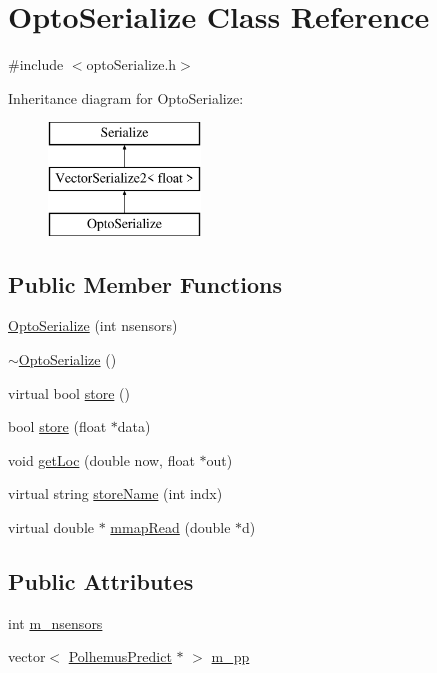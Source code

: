 \hypertarget{classOptoSerialize}{\section{Opto\-Serialize Class Reference}
\label{classOptoSerialize}
}


{\ttfamily \#include $<$opto\-Serialize.\-h$>$}

Inheritance diagram for Opto\-Serialize\-:\begin{figure}[H]
\begin{center}
\leavevmode
\includegraphics[height=3.000000cm]{classOptoSerialize}
\end{center}
\end{figure}
\subsection*{Public Member Functions}
\begin{DoxyCompactItemize}
\item 
\hyperlink{classOptoSerialize_a4b115e74d86c722fd109b3786bbec847}{Opto\-Serialize} (int nsensors)
\item 
\hyperlink{classOptoSerialize_a28b3097639217d817ea084cc870f34b4}{$\sim$\-Opto\-Serialize} ()
\item 
virtual bool \hyperlink{classOptoSerialize_aef848193a25e0b103e31f8d25035af16}{store} ()
\item 
bool \hyperlink{classOptoSerialize_a57544cacf42315f991a6a1d5bfc69d11}{store} (float $\ast$data)
\item 
void \hyperlink{classOptoSerialize_a3c2758b5a41759414f32a90d514ff5b8}{get\-Loc} (double now, float $\ast$out)
\item 
virtual string \hyperlink{classOptoSerialize_a6a29e96b87575f2906b65be40c38ceb2}{store\-Name} (int indx)
\item 
virtual double $\ast$ \hyperlink{classOptoSerialize_a35e6ee49e354276af9548a759fa3f3d2}{mmap\-Read} (double $\ast$d)
\end{DoxyCompactItemize}
\subsection*{Public Attributes}
\begin{DoxyCompactItemize}
\item 
int \hyperlink{classOptoSerialize_acf6821903586a62e8e3d20ffec81a913}{m\-\_\-nsensors}
\item 
vector$<$ \hyperlink{classPolhemusPredict}{Polhemus\-Predict} $\ast$ $>$ \hyperlink{classOptoSerialize_a161d329d6a8ee02c408e017a7f919a86}{m\-\_\-pp}
\end{DoxyCompactItemize}



